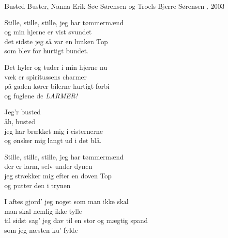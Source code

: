 \begin{song}{Busted}
  {} %
  {Buster, Nanna} %
  {Erik Søe Sørensen og Troels Bjerre Sørensen} %
  {\TKET{}, 2003} %
  {\NotCCLIed} %

  \begin{SBVerse}
    Stille, stille, stille, jeg har tømmermænd\\
    og min hjerne er vist svundet\\
    det sidste jeg så var en lunken Top\\
    som blev for hurtigt bundet.
  \end{SBVerse}

  \begin{SBVerse}
    Det hyler og tuder i min hjerne nu\\
    væk er spiritussens charmer\\
    på gaden kører bilerne hurtigt forbi\\
    og fuglene de \emph{LARMER!}
  \end{SBVerse}

  \begin{SBChorus}
    Jeg’r busted\\
    åh, busted\\
    jeg har brækket mig i cisternerne\\
    og ønsker mig langt ud i det blå.
  \end{SBChorus}

  \begin{SBVerse}
    Stille, stille, stille, jeg har tømmermænd\\
    der er larm, selv under dynen\\
    jeg strækker mig efter en doven Top\\
    og putter den i trynen
  \end{SBVerse}

  \begin{SBVerse}
    I aftes gjord’ jeg noget som man ikke skal\\
    man skal nemlig ikke tylle\\
    til sidst sag’ jeg dav til en stor og mægtig spand\\
    som jeg næsten ku’ fylde
  \end{SBVerse}


\end{song}
